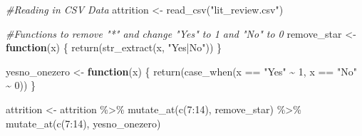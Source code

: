 \documentclass[
]{article}
\newenvironment{Shaded}{\begin{snugshade}}{\end{snugshade}}
\newcommand{\CommentTok}[1]{\textcolor[rgb]{0.56,0.35,0.01}{\textit{#1}}}
\newcommand{\ControlFlowTok}[1]{\textcolor[rgb]{0.13,0.29,0.53}{\textbf{#1}}}
\newcommand{\DecValTok}[1]{\textcolor[rgb]{0.00,0.00,0.81}{#1}}
\newcommand{\FunctionTok}[1]{\textcolor[rgb]{0.00,0.00,0.00}{#1}}
\newcommand{\NormalTok}[1]{#1}
\newcommand{\OtherTok}[1]{\textcolor[rgb]{0.56,0.35,0.01}{#1}}
\newcommand{\SpecialCharTok}[1]{\textcolor[rgb]{0.00,0.00,0.00}{#1}}
\newcommand{\StringTok}[1]{\textcolor[rgb]{0.31,0.60,0.02}{#1}}
\begin{document}
\begin{Shaded}
\begin{Highlighting}[]
\CommentTok{\#Reading in CSV Data}
\NormalTok{attrition }\OtherTok{\textless{}{-}} \FunctionTok{read\_csv}\NormalTok{(}\StringTok{"lit\_review.csv"}\NormalTok{)}


\CommentTok{\#Functions to remove "*" and change "Yes" to 1 and "No" to 0}
\NormalTok{remove\_star }\OtherTok{\textless{}{-}} \ControlFlowTok{function}\NormalTok{(x) \{}
  \FunctionTok{return}\NormalTok{(}\FunctionTok{str\_extract}\NormalTok{(x, }\StringTok{"Yes|No"}\NormalTok{))}
\NormalTok{\}}

\NormalTok{yesno\_onezero }\OtherTok{\textless{}{-}} \ControlFlowTok{function}\NormalTok{(x) \{}
  \FunctionTok{return}\NormalTok{(}\FunctionTok{case\_when}\NormalTok{(x }\SpecialCharTok{==} \StringTok{"Yes"} \SpecialCharTok{\textasciitilde{}} \DecValTok{1}\NormalTok{,}
\NormalTok{                   x }\SpecialCharTok{==} \StringTok{"No"} \SpecialCharTok{\textasciitilde{}} \DecValTok{0}\NormalTok{))}
\NormalTok{\}}

\NormalTok{attrition }\OtherTok{\textless{}{-}}\NormalTok{ attrition }\SpecialCharTok{\%\textgreater{}\%} 
  \FunctionTok{mutate\_at}\NormalTok{(}\FunctionTok{c}\NormalTok{(}\DecValTok{7}\SpecialCharTok{:}\DecValTok{14}\NormalTok{), remove\_star) }\SpecialCharTok{\%\textgreater{}\%}
  \FunctionTok{mutate\_at}\NormalTok{(}\FunctionTok{c}\NormalTok{(}\DecValTok{7}\SpecialCharTok{:}\DecValTok{14}\NormalTok{), yesno\_onezero)}



\end{Highlighting}
\end{Shaded}
\end{document}
